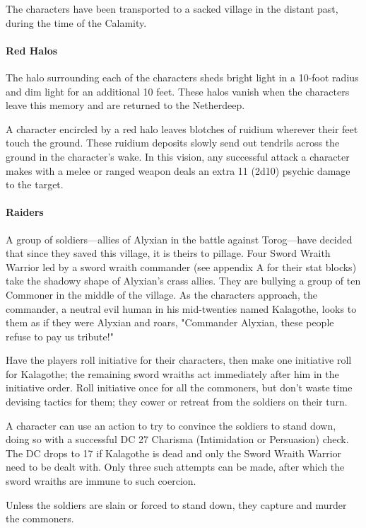 \documentclass[10pt,a4paper,twoside,bg=print,twocolumn,openany,nodeprecatedcode]{dndbook}
\begin{document}
The characters have been transported to a sacked village in the distant past, during the time of the Calamity.

\paragraph{Red Halos}
The halo surrounding each of the characters sheds bright light in a 10-foot radius and dim light for an additional 10 feet. These halos vanish when the characters leave this memory and are returned to the Netherdeep.

A character encircled by a red halo leaves blotches of ruidium wherever their feet touch the ground. These ruidium deposits slowly send out tendrils across the ground in the character's wake. In this vision, any successful attack a character makes with a melee or ranged weapon deals an extra 11 (2d10) psychic damage to the target.

\paragraph{Raiders}
A group of soldiers—allies of Alyxian in the battle against Torog—have decided that since they saved this village, it is theirs to pillage. Four Sword Wraith Warrior led by a sword wraith commander (see appendix A for their stat blocks) take the shadowy shape of Alyxian's crass allies. They are bullying a group of ten Commoner in the middle of the village. As the characters approach, the commander, a neutral evil human in his mid-twenties named Kalagothe, looks to them as if they were Alyxian and roars, "Commander Alyxian, these people refuse to pay us tribute!"

Have the players roll initiative for their characters, then make one initiative roll for Kalagothe; the remaining sword wraiths act immediately after him in the initiative order. Roll initiative once for all the commoners, but don't waste time devising tactics for them; they cower or retreat from the soldiers on their turn.

A character can use an action to try to convince the soldiers to stand down, doing so with a successful DC 27 Charisma (Intimidation or Persuasion) check. The DC drops to 17 if Kalagothe is dead and only the Sword Wraith Warrior need to be dealt with. Only three such attempts can be made, after which the sword wraiths are immune to such coercion.

Unless the soldiers are slain or forced to stand down, they capture and murder the commoners.
\end{document}

